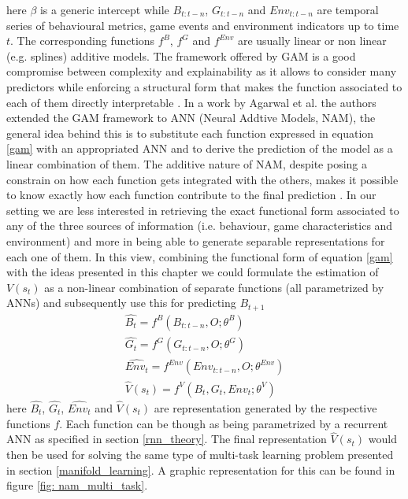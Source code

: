 here $\beta$ is a generic intercept while $B_{t:t-n}$, $G_{t:t-n}$ and $Env_{t:t-n}$ are temporal series of behavioural metrics, game events and environment indicators up to time $t$. The corresponding functions $f^{B}$, $f^{G}$ and $f^{Env}$ are usually linear or non linear (e.g. splines) additive models. The framework offered by GAM is a good compromise between complexity and explainability as it allows to consider many predictors while enforcing a structural form that makes the function associated to each of them directly interpretable \cite{hastie2017generalized}. In a work by Agarwal et al. \cite{agarwal2021neural} the authors extended the GAM framework to ANN (Neural Addtive Models, NAM), the general idea behind this is to substitute each function expressed in equation \ref{gam} with an appropriated ANN and to derive the prediction of the model as a linear combination of them. The additive nature of NAM, despite posing a constrain on how each function gets integrated with the others, makes it possible to know exactly how each function contribute to the final prediction \cite{hastie2017generalized,agarwal2017quitting}. In our setting we are less interested in retrieving the exact functional form associated to any of the three sources of information (i.e. behaviour, game characteristics and environment) and more in being able to generate separable representations for each one of them. In this view, combining the functional form of equation \ref{gam} with the ideas presented in this chapter we could formulate the estimation of $V(s_t)$ as a non-linear combination of separate functions (all parametrized by ANNs) and subsequently use this for predicting $B_{t+1}$
\begin{gather}
\label{nam}
    \widehat{B_t} = f^{B}(B_{t:t-n}, O;\theta^{B}) \\
    \widehat{G_t} = f^{G}(G_{t:t-n}, O;\theta^{G}) \\ 
    \widehat{Env_t} = f^{Env}(Env_{t:t-n}, O;\theta^{Env}) \\
    \widehat{V}(s_t) = f^{V}(B_t, G_t, Env_t; \theta^{V}) \nonumber
\end{gather}
here $\widehat{B_t}$, $\widehat{G_t}$, $\widehat{Env_t}$ and $\widehat{V}(s_t)$ are representation generated by the respective functions $f$. Each function can be though as being parametrized by a recurrent ANN as specified in section \ref{rnn_theory}. The final representation $\widehat{V}(s_t)$ would then be used for solving the same type of multi-task learning problem presented in section \ref{manifold_learning}. A graphic representation for this can be found in figure \ref{fig: nam_multi_task}.


